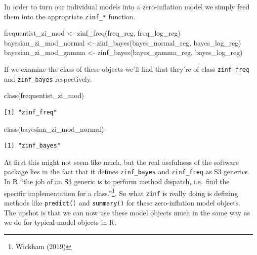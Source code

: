 \documentclass[12pt,twoside]{reedthesis}
\newenvironment{Shaded}{\begin{snugshade}}{\end{snugshade}}
\newcommand{\FunctionTok}[1]{\textcolor[rgb]{0.00,0.00,0.00}{#1}}
\newcommand{\NormalTok}[1]{#1}
\newcommand{\OtherTok}[1]{\textcolor[rgb]{0.56,0.35,0.01}{#1}}
\begin{document}
In order to turn our individual models into a zero-inflation model we simply feed them into the appropriate \texttt{zinf\_*} function.
\begin{Shaded}
\begin{Highlighting}[]
\NormalTok{frequentist\_zi\_mod }\OtherTok{\textless{}{-}} \FunctionTok{zinf\_freq}\NormalTok{(freq\_reg, freq\_log\_reg)}
\NormalTok{bayesian\_zi\_mod\_normal }\OtherTok{\textless{}{-}} \FunctionTok{zinf\_bayes}\NormalTok{(bayes\_normal\_reg, bayes\_log\_reg)}
\NormalTok{bayesian\_zi\_mod\_gamma }\OtherTok{\textless{}{-}} \FunctionTok{zinf\_bayes}\NormalTok{(bayes\_gamma\_reg, bayes\_log\_reg)}
\end{Highlighting}
\end{Shaded}
If we examine the class of these objects we'll find that they're of class \texttt{zinf\_freq} and \texttt{zinf\_bayes} respectively.
\begin{Shaded}
\begin{Highlighting}[]
\FunctionTok{class}\NormalTok{(frequentist\_zi\_mod)}
\end{Highlighting}
\end{Shaded}
\begin{verbatim}
[1] "zinf_freq"
\end{verbatim}
\begin{Shaded}
\begin{Highlighting}[]
\FunctionTok{class}\NormalTok{(bayesian\_zi\_mod\_normal)}
\end{Highlighting}
\end{Shaded}
\begin{verbatim}
[1] "zinf_bayes"
\end{verbatim}
At first this might not seem like much, but the real usefulness of the software package lies in the fact that it defines \texttt{zinf\_bayes} and \texttt{zinf\_freq} as S3 generics. In R ``the job of an S3 generic is to perform method dispatch, i.e.~find the specific implementation for a class.''\footnote{Wickham (2019)}. So what \texttt{zinf} is really doing is defining methods like \texttt{predict()} and \texttt{summary()} for these zero-inflation model objects. The upshot is that we can now use these model objects much in the same way as we do for typical model objects in R.
\end{document}
